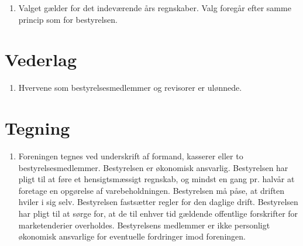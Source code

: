 \documentclass[a4paper, 10pt]{article}
\newenvironment{stykenum}{
  \begin{enumerate}[%
    label=Stk.~\arabic*., ref=\textsection~\theenumi~Stk.~\arabic*, start=1]
}{\end{enumerate}}
\begin{document}
\begin{stykenum}
\subsubsection*{Optælling}
\begin{itemize}

\item Der udregnes fordelingstal svarende til gyldige stemmer/antal poster.

\item Har nogen kandidater opnået fordelingstallet på 1.-stemmer er disse
\\ valgt. Nr. 1 er den med flest 1.-stemmer osv.

\item For de kandidater, der ikke opnår fordelingstallet med
1.-stemmer, ses på 2.-stemmer lagt sammen med 1.-stemmer. Hvis der
stadig er ubesatte poster, ses på 1.-stemmer lagt sammen med 2.stemmer
og 3.-stemmer, osv.

\item Er der stemmelighed på 1.-stemmer, er antallet af 2.-stemmer
afgørende for hvem er nr.  1, osv.

\item Har to kandidater stemmelighed ved alle prioritetsstemmer
foretages \\ lodtrækning.

\end{itemize}

\subsection*{Valg af revisorer}

\item Valget gælder for det indeværende års regnskaber. Valg foregår efter
samme princip som for bestyrelsen.
\end{stykenum}

\section{Vederlag}
\begin{stykenum}
    \item Hvervene som bestyrelsesmedlemmer og revisorer er ulønnede.
\end{stykenum}

\section{Tegning}
\begin{stykenum}  
    \item Foreningen tegnes ved underskrift af formand, kasserer eller to
bestyrelses\-medlemmer. Bestyrelsen er økonomisk ansvarlig.
Bestyrelsen har pligt til at føre et hensigtsmæssigt regnskab, og
mindst en gang pr. halvår at foretage en opgørelse af
varebeholdningen. Bestyrelsen må påse, at driften hviler i sig selv.
Bestyrelsen fastsætter regler for den daglige drift. Bestyrelsen har
pligt til at sørge for, at de til enhver tid gældende offentlige
forskrifter for marketenderier overholdes. Bestyrelsens medlemmer er
ikke personligt økonomisk ansvar\-lige for eventuelle fordringer imod
foreningen.
\end{stykenum}
\end{document}
